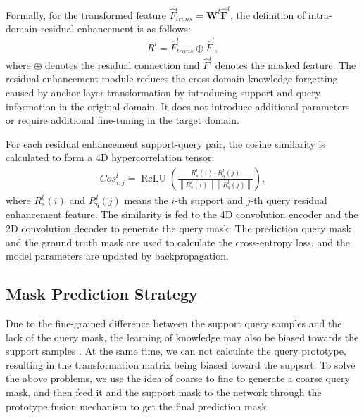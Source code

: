 \documentclass{bmvc2k}
\begin{document}
Formally, for the transformed feature $\hat{F}^l_{trans}=\mathbf{W}^l \mathbf{\hat{F}}^l$, the definition of intra-domain residual enhancement is as follows:
\begin{eqnarray}
R^l=\hat{F}^l_{trans}\oplus\hat{F}^l,
\end{eqnarray}
where $\oplus$ denotes the residual connection and $\hat{F}^l$ denotes the masked feature.
The residual enhancement module reduces the cross-domain knowledge forgetting caused by anchor layer transformation by introducing support and query information in the original domain.
It does not introduce additional parameters or require additional fine-tuning in the target domain.

For each residual enhancement support-query pair, the cosine similarity is calculated to form a 4D hypercorrelation tensor:
\begin{eqnarray}
\label{SIM}
Cos^l_{i,j}  =  \operatorname{ReLU}\left(\frac{R^l_{s}(i) \cdot R^l_{q}(j)}{\left\|R^l_{s}(i)\right\|\left\|R^l_{q}(j)\right\|}\right),
\end{eqnarray}
where $R^l_{s}(i)$ and $R^l_{q}(j)$ means the $i$-th support 
and $j$-th query residual enhancement feature.
The similarity is fed to the 4D convolution encoder and the 2D convolution decoder to generate the query mask.
The prediction query mask and the ground truth mask are used to calculate the cross-entropy loss, and the model parameters are updated by backpropagation.


\subsection{Mask Prediction Strategy}
Due to the fine-grained difference between the support query samples and the lack of the query mask, the learning of knowledge may also be biased towards the support samples \cite{zha2023boosting}.
At the same time, we can not calculate the query prototype, resulting in the transformation matrix being biased toward the support. 
To solve the above problems, we use the idea of coarse to fine \cite{marr2010vision} to generate a coarse query mask, and then feed it and the support mask to the network through the prototype fusion mechanism to get the final prediction mask.
\end{document}
